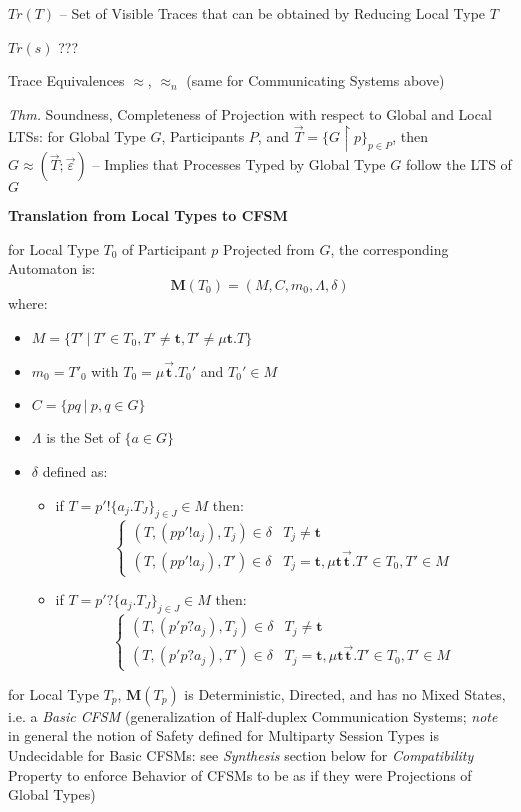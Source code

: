 $Tr(T)$ -- Set of Visible Traces that can be obtained by Reducing
Local Type $T$

$Tr(s)$ ??? %

Trace Equivalences $\approx$, $\approx_n$ (same for Communicating
Systems above)

\emph{Thm.} Soundness, Completeness of Projection with respect to
Global and Local LTSs: for Global Type $G$, Participants $P$, and
$\vec{T} = \{G \upharpoonright p\}_{p \in P}$, then $G \approx
(\vec{T}; \vec{\varepsilon})$ -- Implies that Processes Typed by
Global Type $G$ follow the LTS of $G$


\textbf{Translation from Local Types to CFSM}

for Local Type $T_0$ of Participant $p$ Projected from $G$, the
corresponding Automaton is:
\[
  \mathbf{M}(T_0) = (M,C,m_0,\Lambda,\delta)
\]
where:
\begin{itemize}
  \item $M = \{ T' \ |\ T' \in T_0, T' \neq \mathbf{t},
    T' \neq \mu\mathbf{t}.T \}$
  \item $m_0 = T'_0$ with $T_0 = \mu\vec{\mathbf{t}}.T_0'$ and $T_0'
    \in M$
  \item $C = \{ pq \ |\ p,q \in G \}$
  \item $\Lambda$ is the Set of $\{ a \in G \}$
  \item $\delta$ defined as:
    \begin{itemize}
      \item if $T = p'!\{a_j.T_J\}_{j \in J} \in M$ then:
\[
  \begin{cases}
    (T,(pp'!a_j),T_j) \in \delta & T_j \neq \mathbf{t} \\
    (T,(pp'!a_j),T') \in \delta & T_j = \mathbf{t},
      \mu\mathbf{t}\vec{\mathbf{t}}.T' \in T_0, T' \in M
  \end{cases}
\]
      \item if $T = p'?\{a_j.T_J\}_{j \in J} \in M$ then:
\[
  \begin{cases}
    (T,(p'p?a_j),T_j) \in \delta & T_j \neq \mathbf{t} \\
    (T,(p'p?a_j),T') \in \delta & T_j = \mathbf{t},
      \mu\mathbf{t}\vec{\mathbf{t}}.T' \in T_0, T' \in M
  \end{cases}
\]
    \end{itemize}
\end{itemize}

for Local Type $T_p$, $\mathbf{M}(T_p)$ is Deterministic, Directed,
and has no Mixed States, i.e. a \emph{Basic CFSM} (generalization of
Half-duplex Communication Systems; \emph{note} in general the notion
of Safety defined for Multiparty Session Types is Undecidable for
Basic CFSMs: see \emph{Synthesis} section below for
\emph{Compatibility} Property to enforce Behavior of CFSMs to be as if
they were Projections of Global Types)


